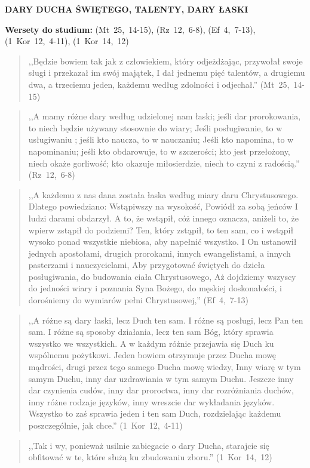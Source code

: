 \documentclass[10pt,a4paper,oneside]{article}
\begin{document}
\centerline{\textbf{\MakeUppercase{Dary Ducha Świętego, talenty, dary łaski}}}
\begin{center}
\textbf{Wersety do studium:} (Mt~25,~14-15), (Rz~12,~6-8), (Ef~4,~7-13), (1~Kor~12,~4-11), (1~Kor~14,~12)
\end{center}
\begin{quote}
,,Będzie bowiem tak jak z człowiekiem, który odjeżdżając, przywołał swoje sługi i przekazał im swój majątek, I dał jednemu pięć talentów, a drugiemu dwa, a trzeciemu jeden, każdemu według zdolności i odjechał.'' (Mt~25,~14-15)
\end{quote}
\begin{quote}
,,A mamy różne dary według udzielonej nam łaski; jeśli dar prorokowania, to niech będzie używany stosownie do wiary; Jeśli posługiwanie, to w usługiwaniu ; jeśli kto naucza, to w nauczaniu; Jeśli kto napomina, to w napominaniu; jeśli kto obdarowuje, to w szczerości; kto jest przełożony, niech okaże gorliwość; kto okazuje miłosierdzie, niech to czyni z radością.'' (Rz~12,~6-8)
\end{quote}
\begin{quote}
,,A każdemu z nas dana została łaska według miary daru Chrystusowego. Dlatego powiedziano: Wstąpiwszy na wysokość, Powiódł za sobą jeńców I ludzi darami obdarzył. A to, że wstąpił, cóż innego oznacza, aniżeli to, że wpierw zstąpił do podziemi? Ten, który zstąpił, to ten sam, co i wstąpił wysoko ponad wszystkie niebiosa, aby napełnić wszystko. I On ustanowił jednych apostołami, drugich prorokami, innych ewangelistami, a innych pasterzami i nauczycielami, Aby przygotować świętych do dzieła posługiwania, do budowania ciała Chrystusowego, Aż dojdziemy wszyscy do jedności wiary i poznania Syna Bożego, do męskiej doskonałości, i dorośniemy do wymiarów pełni Chrystusowej,'' (Ef~4,~7-13)
\end{quote}
\begin{quote}
,,A różne są dary łaski, lecz Duch ten sam. I różne są posługi, lecz Pan ten sam. I różne są sposoby działania, lecz ten sam Bóg, który sprawia wszystko we wszystkich. A w każdym różnie przejawia się Duch ku wspólnemu pożytkowi. Jeden bowiem otrzymuje przez Ducha mowę mądrości, drugi przez tego samego Ducha mowę wiedzy, Inny wiarę w tym samym Duchu, inny dar uzdrawiania w tym samym Duchu. Jeszcze inny dar czynienia cudów, inny dar proroctwa, inny dar rozróżniania duchów, inny różne rodzaje języków, inny wreszcie dar wykładania języków. Wszystko to zaś sprawia jeden i ten sam Duch, rozdzielając każdemu poszczególnie, jak chce.'' (1~Kor~12,~4-11)
\end{quote}
\begin{quote}
,,Tak i wy, ponieważ usilnie zabiegacie o dary Ducha, starajcie się obfitować w te, które służą ku zbudowaniu zboru.'' (1~Kor~14,~12)
\end{quote}
\end{document}
